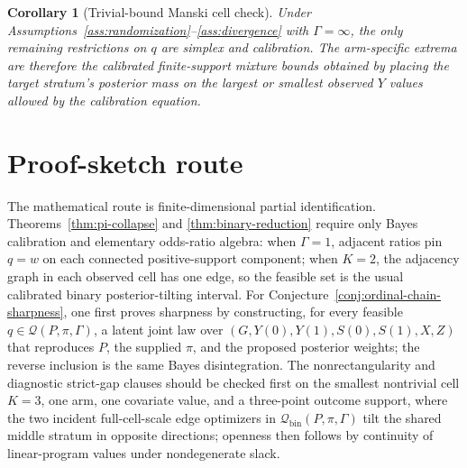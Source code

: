 \documentclass[11pt]{article}
\theoremstyle{definition}
\theoremstyle{plain}
\newtheorem{corollary}{Corollary}
\theoremstyle{remark}
\begin{document}
\begin{corollary}[Trivial-bound Manski cell check]\label{cor:infty}
Under Assumptions~\ref{ass:randomization}--\ref{ass:divergence} with \(\Gamma=\infty\), the only remaining restrictions on \(q\) are simplex and calibration.  The arm-specific extrema are therefore the calibrated finite-support mixture bounds obtained by placing the target stratum's posterior mass on the largest or smallest observed \(Y\) values allowed by the calibration equation.
\end{corollary}

\section{Proof-sketch route}
The mathematical route is finite-dimensional partial identification.  Theorems~\ref{thm:pi-collapse} and \ref{thm:binary-reduction} require only Bayes calibration and elementary odds-ratio algebra: when \(\Gamma=1\), adjacent ratios pin \(q=w\) on each connected positive-support component; when \(K=2\), the adjacency graph in each observed cell has one edge, so the feasible set is the usual calibrated binary posterior-tilting interval.  For Conjecture~\ref{conj:ordinal-chain-sharpness}, one first proves sharpness by constructing, for every feasible \(q\in\mathcal Q(P,\pi,\Gamma)\), a latent joint law over \((G,Y(0),Y(1),S(0),S(1),X,Z)\) that reproduces \(P\), the supplied \(\pi\), and the proposed posterior weights; the reverse inclusion is the same Bayes disintegration.  The nonrectangularity and diagnostic strict-gap clauses should be checked first on the smallest nontrivial cell \(K=3\), one arm, one covariate value, and a three-point outcome support, where the two incident full-cell-scale edge optimizers in \(\mathcal Q_{\mathrm{bin}}(P,\pi,\Gamma)\) tilt the shared middle stratum in opposite directions; openness then follows by continuity of linear-program values under nondegenerate slack.
\end{document}
